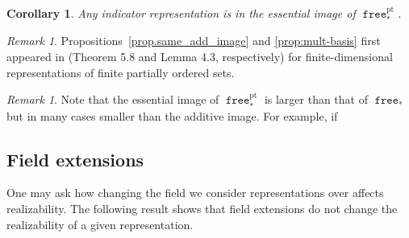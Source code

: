 \documentclass[a4paper]{amsart}
\theoremstyle{plain}
\newtheorem{corollary}[theorem]{Corollary}
\theoremstyle{definition}
\theoremstyle{remark}
\newtheorem{remark}[theorem]{Remark}
\newcommand{\funct}[1]{\operatorname{\mathtt{#1}}}
\begin{document}
\begin{corollary}\label{cor.const_essimg}
Any indicator representation is in the essential image of $\funct{free}^\mathrm{pt}_*$.
\end{corollary}

\begin{remark}
Propositions~\ref{prop.same_add_image} and \ref{prop:mult-basis} first appeared in  \cite{brodzki2020complexity} (Theorem 5.8 and Lemma 4.3, respectively) for finite-dimensional representations of finite partially ordered sets. 
\end{remark}


\begin{remark} 
Note that the essential image of $\funct{free}^\mathrm{pt}_*$ is larger than that of $\funct{free}_*$ but in many cases smaller than the additive image.
For example, if 
\end{remark}

\subsection{Field extensions}
One may ask how changing the field we consider representations over affects realizability. The following result shows that field extensions do not change the realizability of a given representation.
\end{document}
